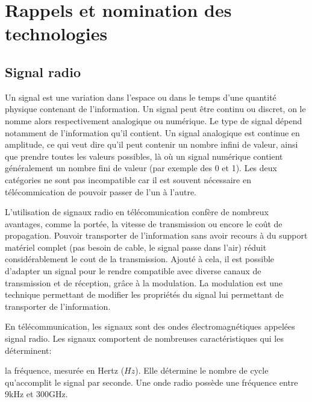 \renewcommand{\leftmark}{NOMINATION DES TECHNOLOGIES}


\chapter{Rappels et nomination des technologies}\label{chap1}

\section{Signal radio}

Un signal est une variation dans l'espace ou dans le temps d'une quantité physique contenant de l'information. Un signal peut être continu ou discret, on le nomme alors respectivement analogique ou numérique. Le type de signal dépend notamment de l'information qu'il contient. Un signal analogique est continue en amplitude, ce qui veut dire qu'il peut contenir un nombre infini de valeur, ainsi que prendre toutes les valeurs possibles, là où un signal numérique contient généralement un nombre fini de valeur (par exemple des 0 et 1).
Les deux catégories ne sont pas incompatible car il est souvent nécessaire en télécommication de pouvoir passer de l'un à l'autre.\cite{test}

\vspace{0.1cm}

L'utilisation de signaux radio en télécomunication confère de nombreux avantages, comme la portée, la vitesse de transmission  ou encore le coût de propagation. Pouvoir transporter de l'information sans avoir recours à du support matériel complet (pas besoin de cable, le signal passe dans l'air) réduit\\ considérablement le cout de la transmission. Ajouté à cela, il est possible d'adapter un signal pour le rendre compatible avec diverse canaux de transmission et de réception, grâce à la modulation. La modulation est une technique permettant de modifier les propriétés du signal lui permettant de transporter de l'information.

\newpage

En télécommunication, les signaux sont des ondes électromagnétiques appelées signal radio. Les signaux comportent de nombreuses caractéristiques qui les déterminent: 

\vspace{0.1cm}



la fréquence, mesurée en Hertz ($Hz$). Elle détermine le nombre de cycle qu'accomplit le signal par seconde. Une onde radio possède une fréquence entre 9kHz et 300GHz.

